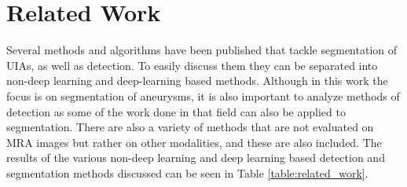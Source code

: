 \chapter{Related Work}
\label{chapter2}

Several methods and algorithms have been published that tackle segmentation of UIAs, as well as detection. To easily discuss them they can be separated into non-deep learning and deep-learning based methods. Although in this work the focus is on segmentation of aneurysms, it is also important to analyze methods of detection as some of the work done in that field can also be applied to segmentation. There are also a variety of methods that are not evaluated on MRA images but rather on other modalities, and these are also included. The results of the various non-deep learning and deep learning based detection and segmentation methods discussed can be seen in Table \ref{table:related_work}.

